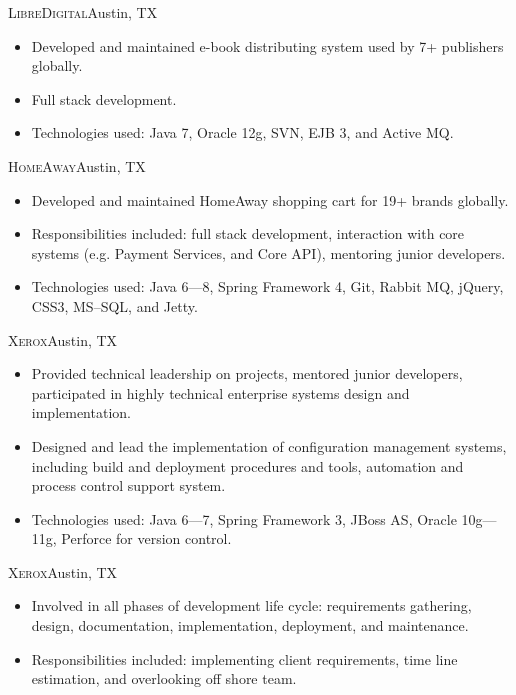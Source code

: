 \documentclass[11pt,letterpaper,sans]{moderncv}
\begin{document}
     {\textsc{LibreDigital}}{Austin, TX}{}
     {\begin{itemize}
         \item Developed and maintained e-book distributing system
               used by 7+ publishers globally.
         \item Full stack development.
         \item Technologies used: Java 7, Oracle 12g, SVN, EJB 3, and
               Active MQ.
     \end{itemize}}

     {\textsc{HomeAway}}{Austin, TX}{}
     {\begin{itemize}
         \item Developed and maintained HomeAway shopping cart for 19+
               brands globally.
         \item Responsibilities included: full stack development, interaction
               with core systems (e.g. Payment Services, and Core API),
               mentoring junior developers.
         \item Technologies used: Java 6---8, Spring Framework 4, Git,
               Rabbit MQ, jQuery, CSS3, MS--SQL, and Jetty.
     \end{itemize}}

     {\textsc{Xerox}}{Austin, TX}{}
     {\begin{itemize}
         \item Provided technical leadership on projects, mentored junior
               developers, participated in highly technical enterprise
               systems design and implementation.
         \item Designed and lead the implementation of configuration
               management systems, including build and deployment procedures
               and tools, automation and process control support system.
         \item Technologies used: Java 6---7, Spring Framework 3, JBoss
               AS, Oracle 10g---11g, Perforce for version control.
     \end{itemize}}

     {\textsc{Xerox}}{Austin, TX}{}
     {\begin{itemize}
         \item Involved in all phases of development life cycle:
               requirements gathering, design, documentation,
               implementation, deployment, and maintenance.
         \item Responsibilities included: implementing client requirements,
               time line estimation, and overlooking off shore team.
     \end{itemize}}
\end{document}
